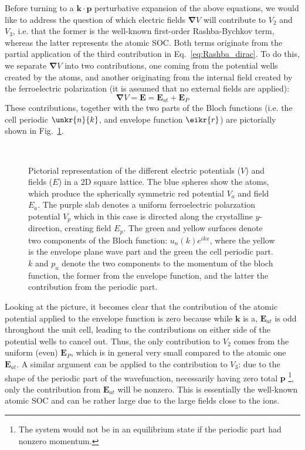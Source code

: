 Before turning to a $\bm{k} \cdot \bm{p}$ perturbative expansion of the above equations, we would like to address the question of which electric fields $\bm{\nabla}V$ will contribute to $V_2$ and $V_3$, i.e. that the former is the well-known first-order Rashba-Bychkov term, whereas the latter represents the atomic SOC.
Both terms originate from the partial application of the third contribution in Eq.~\ref{eq:Rashba_dirac}.
To do this, we separate $\bm{\nabla}V$ into two contributions, one coming from the potential wells created by the atoms, and another originating from the internal field created by the ferroelectric polarization (it is assumed that no external fields are applied):
\begin{equation}
	\bm{\nabla} V = \bm{E} = \bm{E}_{at} + \bm{E}_{P}
\end{equation}
These contributions, together with the two parts of the Bloch functions (i.e. the cell periodic $\unkr{n}{k}$, and envelope function $\eikr{r}$) are pictorially shown in Fig.~\ref{fig:Efield_cell_drawing}. 
\begin{figure}[h]
~\centering
{}\caption{\label{fig:Efield_cell_drawing} Pictorial representation of the different electric potentials ($V$) and fields ($E$) in a 2D square lattice. The blue spheres show the atoms, which produce the spherically symmetric red potential $V_a$ and field $E_a$. The purple slab denotes a uniform ferroelectric polarzation potential $V_p$ which in this case is directed along the crystalline $y$-direction, creating field $E_p$. The green and yellow surfaces denote two components of the Bloch function: $u_n(k) e^{ikx}$, where the yellow is the envelope plane wave part and the green the cell periodic part. $k$ and $p_u$ denote the two components to the momentum of the bloch function, the former from the envelope function, and the latter the contribution from the periodic part.}
\end{figure}

Looking at the picture, it becomes clear that the contribution of the atomic potential applied to the envelope function is zero because while $\bm{k}$ is a, $\bm{E}_{at}$ is odd throughout the unit cell, leading to the contributions on either side of the potential wells to cancel out.
Thus, the only contribution to $V_2$ comes from the uniform (even) $\bm{E}_P$, which is in general very small compared to the atomic one $\bm{E}_{at}$.
A similar argument can be applied to the contribution to $V_3$: due to the shape of the periodic part of the wavefunction, necessarily having zero total $\bm{p}$ \footnote{The system would not be in an equilibrium state if the periodic part had nonzero momentum.}, only the contribution from $\bm{E}_{at}$ will be nonzero.
This is essentially the well-known atomic SOC and can be rather large due to the large fields close to the ions. 

